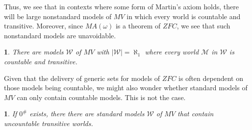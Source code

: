 \documentclass[10pt,a4paper]{amsart}
\numberwithin{equation}{section}
\numberwithin{figure}{section}
\theoremstyle{plain}
\theoremstyle{plain}
\theoremstyle{plain}
\newtheorem{cor}[thm]{\protect\corollaryname}
\theoremstyle{plain}
\newtheorem{prop}[thm]{\protect\propositionname}
\theoremstyle{remark}
\theoremstyle{plain}
\theoremstyle{definition}
\providecommand{\corollaryname}{Corollary}
\providecommand{\propositionname}{Proposition}
\begin{document}
Thus, we see that in contexts where some form of Martin's axiom holds,
there will be large nonstandard models of $MV$ in which every world
is countable and transitive. Moreover, since $MA(\omega)$ is a theorem
of $ZFC$, we see that such nonstandard models are unavoidable.
\begin{cor}
There are models $\mathcal{W}$ of $MV$ with $|\mathcal{W}|=\aleph_{1}$
where every world $\mathcal{M}$ in $\mathcal{W}$ is countable and
transitive. 
\end{cor}

Given that the delivery of generic sets for models of $ZFC$ is often
dependent on those models being countable, we might also wonder whether
standard models of $MV$ can only contain countable models. This is
not the case. 
\begin{prop}
If $0^{\#}$ exists, there there are standard models $\mathcal{W}$
of $MV$ that contain uncountable transitive worlds.\label{prop:Hjorth}
\end{prop}
\end{document}
